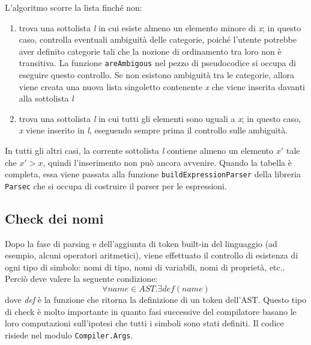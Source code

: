 \documentclass[10pt,a4paper]{article}
\begin{document}
L'algoritmo scorre la lista finché non:
\begin{enumerate}
    \item trova una sottolista \textit{l} in cui esiste almeno un elemento minore di \textit{x}; in questo caso, controlla
    eventuali ambiguità delle categorie, poiché l'utente potrebbe aver definito categorie tali che la nozione di
    ordinamento tra loro non è transitiva. La funzione \texttt{areAmbigous} nel pezzo di pseudocodice si occupa
    di eseguire questo controllo. Se non esistono ambiguità tra le categorie, allora viene creata una nuova lista
    singoletto contenente \textit{x} che viene inserita davanti alla sottolista \textit{l}
    \item trova una sottolista \textit{l} in cui tutti gli elementi sono uguali a \textit{x}; in questo caso, \textit{x}
    viene inserito in \textit{l}, eseguendo sempre prima il controllo sulle ambiguità.
\end{enumerate}
In tutti gli altri casi, la corrente sottolista \textit{l} contiene almeno un elemento $ x' $ tale che
$ x' > x $, quindi l'inserimento non può ancora avvenire. Quando la tabella è completa, essa viene passata alla
funzione \texttt{buildExpressionParser} della libreria \texttt{Parsec} che si occupa di costruire il parser per le
espressioni.

\subsection{Check dei nomi}
Dopo la fase di parsing e dell'aggiunta di token built-in del linguaggio (ad esempio, alcuni operatori aritmetici),
viene effettuato il controllo di esistenza di ogni tipo di simbolo: nomi di tipo, nomi di variabili, nomi di proprietà,
etc.. Perciò deve valere la seguente condizione:
    \[ \forall name \in AST. \exists def(name) \]
dove \textit{def} è la funzione che ritorna la definizione di un token dell'AST.
Questo tipo di check è molto importante in quanto fasi successive del compilatore basano le loro computazioni
sull'ipotesi che tutti i simboli sono stati definiti. Il codice risiede nel modulo \texttt{Compiler.Args}.
\end{document}
